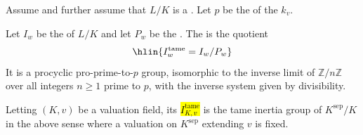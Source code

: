 \begin{definition} \label{definition:tame_inertia_group_of_a_general_galois_extension_of_valuation_fields}
    Assume  and further assume that $L/K$ is a . Let $p$ be the  of the  $k_v$.

    Let $I_w$ be the  of $L/K$ and let $P_w$ be the .
    The  is the quotient
    $$\hlin{I_w^{\text{tame}} = I_w / P_w}$$
    It is a procyclic pro-prime-to-$p$ group, isomorphic to the inverse limit of $\mathbb{Z}/n\mathbb{Z}$ over all integers $n \geq 1$ prime to $p$, with the inverse system given by divisibility.

    Letting $(K,v)$ be a valuation field, its  \hl{$I_{K,v}^{\text{tame}}$} is the tame inertia group of $K^{\text{sep}} / K$ in the above sense where a valuation on $K^{\text{sep}}$ extending $v$ is fixed.
\end{definition}
